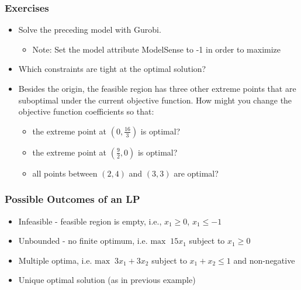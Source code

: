 \documentclass[12pt,handout]{beamer}
\begin{document}
\begin{frame}
\frametitle{Exercises}
\begin{itemize}
\item Solve the preceding model with Gurobi.
    \begin{itemize}
    \item Note: Set the model attribute ModelSense to -1 in order to maximize
    \end{itemize}
\item Which constraints are tight at the optimal solution?
\item Besides the origin, the feasible region has three other extreme points that are suboptimal under the current objective function. How might you change the objective function coefficients so that:
    \begin{itemize}
    \item the extreme point at $(0, \frac{16}{3})$ is optimal?
    \item the extreme point at $(\frac{9}{2}, 0)$ is optimal?
    \item all points between $(2, 4)$ and $(3, 3)$ are optimal?
    \end{itemize}
\end{itemize}
\end{frame}

\begin{frame}
\frametitle{Possible Outcomes of an LP}
\begin{itemize}
\item Infeasible - feasible region is empty, i.e., $x_1 \ge 0$, $x_1 \le -1$
\item Unbounded - no finite optimum, i.e. $\mbox{max}\;\; 15 x_1$ subject to $x_1 \ge 0$
\item Multiple optima, i.e. $\mbox{max}\;\; 3x_1 + 3x_2$ subject to $x_1 + x_2 \le 1$ and non-negative
\item Unique optimal solution (as in previous example)
\end{itemize}
\end{frame}
\end{document}

